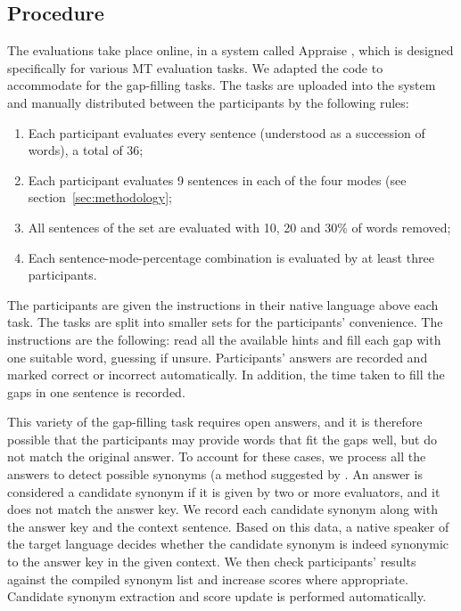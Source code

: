 \documentclass[11pt]{article}
\newcommand{\comment}[1]{\marginpar{\scriptsize\sf \textcolor{blue}{#1}}}
\begin{document}
\subsection{Procedure}

The evaluations take place online, in a system called Appraise \citep{federmann12}, which is 
designed specifically for various MT evaluation tasks. We adapted the code to 
accommodate for the gap-filling tasks. The tasks are uploaded into the system and 
manually distributed between the participants by the following rules:
\begin{enumerate}
\item  Each participant evaluates every sentence (understood as a succession of words),
a total of 36;
\item  Each participant evaluates 9 sentences in each of the four modes (see section~\ref{sec:methodology};
\item  All sentences of the set are evaluated with 10, 20 and 30\% of words removed;
\item  Each sentence-mode-percentage combination is evaluated by at least three participants.
\end{enumerate}

The participants are given the instructions in their native language above each task. The
tasks are split into smaller sets for the participants' convenience. The instructions are the 
following: read all the available hints and fill each gap with one suitable word, guessing if unsure.
Participants' answers are recorded and marked correct or incorrect automatically. In
addition, the time taken to fill the gaps in one sentence is recorded.

This variety of the gap-filling task requires open answers, and it is therefore possible that the participants may
provide words that fit the gaps well, but do not match the original answer. To account for
these cases, we process all the answers to detect possible synonyms (a method suggested by \citet{oregan13}. An answer is
considered a candidate synonym if it is given by two or more evaluators, and it does not match
the answer key. We record each candidate synonym along with the answer key and the
context sentence. Based on this data, a native speaker of the target language decides
whether the candidate synonym is indeed synonymic to the answer key in the given
context. We then check participants' results against the compiled synonym list and
increase scores where appropriate. Candidate synonym extraction and score update is performed automatically.
\comment{FMT: How long did making the synonym list take, how many synonyms were added? More details here. Also perhaps an example?}
\end{document}
